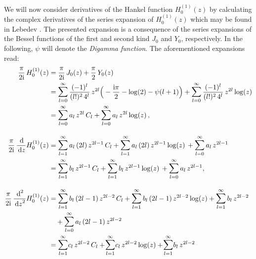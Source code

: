 We will now consider derivatives of the Hankel function $H_0^{(1)}(z)$ by calculating the complex derivatives of the series expansion of $H_0^{(1)}(z)$ which may be found in Lebedev \cite[Sec.\@~5.6]{lebedev}. 
The presented expansion is a consequence of the series expansions of the Bessel functions of the first and second kind $J_0$ and $Y_0$, respectively.
In the following, $\psi$ will denote the \emph{Digamma function}. 
The aforementioned expansions read:
\begin{align*}
  \frac{\pi}{2 \ii} \, H_0^{(1)}(z)
  &= \frac{\pi}{2\ii} \, J_0(z) + \frac{\pi}{2}\, Y_0(z) \\
  &= \mathlarger{\sum}_{l = 0}^\infty \, \frac{(-1)^l}{(l!)^2 \, 4^l} \,  z^{2l} \Big( -\frac{\ii \pi}{2} - \log(2) - \psi(l + 1) \Big) 
  +  \mathlarger{\sum}_{l = 0}^\infty \, \frac{(-1)^l}{(l!)^2 \, 4^l} \,  z^{2l} \log(z) \\
  &= \mathlarger{\sum}_{l = 0}^\infty \, a_l \,  z^{2l} \, C_l 
   + \mathlarger{\sum}_{l = 0}^\infty \, a_l  \,z^{2l} \log(z)\,, \\[1.0em]
  \frac{\pi}{2\ii} \, \frac{\d{}}{\d z} H_0^{(1)}(z)
  &= \mathlarger{\sum}_{l = 1}^\infty \, a_l \,  (2l) \, z^{2l - 1} \, C_l 
  + \mathlarger{\sum}_{l = 1}^\infty \, a_l \, (2l)  \, z^{2l - 1} \log(z) \, 
  + \mathlarger{\sum}_{l = 0}^\infty \, a_l \, z^{2l - 1} \\
  &= \mathlarger{\sum}_{l = 1}^\infty \, b_l \, z^{2l - 1} \, C_l 
  + \mathlarger{\sum}_{l = 1}^\infty \, b_l \, z^{2l - 1} \log(z) \, 
  +  \mathlarger{\sum}_{l = 0}^\infty \, a_l \, z^{2l - 1}, \\[1.0em]
  \frac{\pi}{2\ii} \, \frac{\d{}^2}{\d z^2} H_0^{(1)}(z)
  &= \mathlarger{\sum}_{l = 1}^\infty \, b_l \, (2l - 1) \, z^{2l - 2} \, C_l 
  + \mathlarger{\sum}_{l = 1}^\infty \, b_l \, (2l - 1)\, z^{2l - 2} \log(z) 
  + \mathlarger{\sum}_{l = 1}^\infty \, b_l \, z^{2l - 2}\\
  &\quad + \mathlarger{\sum}_{l = 0}^\infty \, a_l \, (2l - 1) \, z^{2l - 2} \\
  &=   \mathlarger{\sum}_{l = 1}^\infty c_l \, z^{2l - 2} \, C_l 
  +  \!\mathlarger{\sum}_{l = 1}^\infty c_l \, z^{2l - 2} \log(z) 
  +  \!\mathlarger{\sum}_{l = 1}^\infty b_l \, z^{2l - 2} 

\end{align*}
